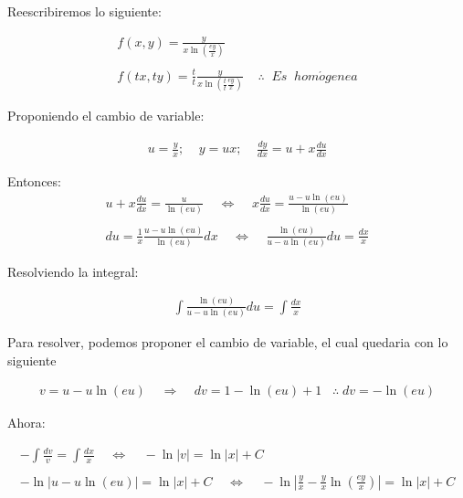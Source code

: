 Reescribiremos lo siguiente:

\begin{equation*}
    \begin{gathered}
        f(x,y)=\frac{y}{x\ln\left(\frac{ey}{x}\right)}\\\\
        f(tx,ty)=\frac{t}{t}\frac{y}{x\ln\left(\frac{t}{t}\frac{ey}{x}\right)}\;\;\;\;\therefore\;\;Es\;\;hom\acute{o}genea
    \end{gathered}
\end{equation*}

Proponiendo el cambio de variable:

\begin{equation*}
    \begin{gathered}
        u=\frac{y}{x};\;\;\;\;y=ux;\;\;\;\;\frac{dy}{dx}=u+x\frac{du}{dx}
    \end{gathered}
\end{equation*}

Entonces:
\begin{equation*}
    \begin{gathered}
        u+x\frac{du}{dx}=\frac{u}{\ln(eu)}\;\;\;\;\Leftrightarrow\;\;\;\;x\frac{du}{dx}=\frac{u-u\ln(eu)}{\ln(eu)}\\\\
        du=\frac{1}{x}\frac{u-u\ln(eu)}{\ln(eu)}dx\;\;\;\;\Leftrightarrow\;\;\;\;\frac{\ln(eu)}{u-u\ln(eu)}du=\frac{dx}{x}
    \end{gathered}
\end{equation*}

Resolviendo la integral:

\begin{equation*}
    \begin{gathered}
        \int\frac{\ln(eu)}{u-u\ln(eu)}du=\int\frac{dx}{x}
    \end{gathered}
\end{equation*}

Para resolver, podemos proponer el cambio de variable, el cual quedaria con lo siguiente

\begin{equation*}
    \begin{gathered}
        v=u-u\ln(eu)\;\;\;\;\Rightarrow\;\;\;\;dv=1-\ln(eu)+1\;\;\;\therefore\;dv=-\ln(eu)
    \end{gathered}
\end{equation*}

Ahora:

\begin{equation*}
    \begin{gathered}
        -\int\frac{dv}{v}=\int\frac{dx}{x}\;\;\;\;\Leftrightarrow\;\;\;\;-\ln|v|=\ln|x|+C\\\\
        -\ln|u-u\ln(eu)|=\ln|x|+C\;\;\;\;\Leftrightarrow\;\;\;\;-\ln\left|\frac{y}{x}-\frac{y}{x}\ln\left(\frac{ey}{x}\right)\right|=\ln|x|+C
    \end{gathered}
\end{equation*}

